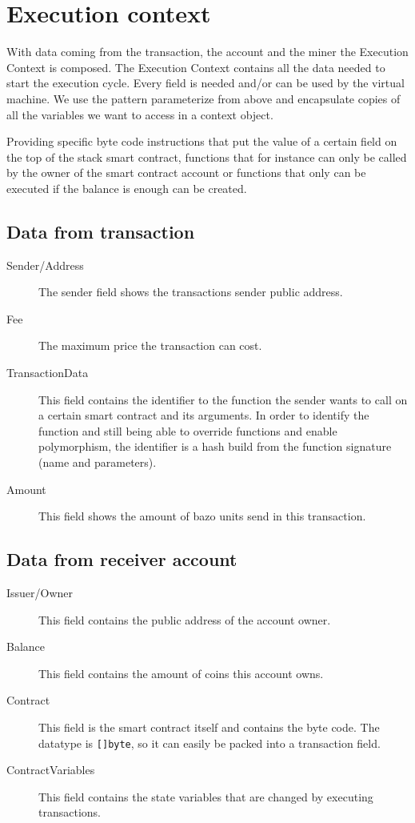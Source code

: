 \section{Execution context}
With data coming from the transaction, the account and the miner the Execution Context is composed. The Execution Context contains all the data needed to start the execution cycle. Every field is needed and/or can be used by the virtual machine. We use the pattern parameterize from above and encapsulate copies of all the variables we want to access in a context object.

Providing specific byte code instructions that put the value of a certain field on the top of the stack smart contract, functions that for instance can only be called by the owner of the smart contract account or functions that only can be executed if the balance is enough can be created.

\subsection{Data from transaction}
\begin{description}
  \item[Sender/Address] The sender field shows the transactions sender public address.
  \item[Fee] The maximum price the transaction can cost.
  \item[TransactionData] This field contains the identifier to the function the sender wants to call on a certain smart contract and its arguments. In order to identify the function and still being able to override functions and enable polymorphism, the identifier is a hash build from the function signature (name and parameters).
  \item[Amount] This field shows the amount of bazo units send in this transaction.
\end{description}

\subsection{Data from receiver account}
\begin{description}
  \item[Issuer/Owner] This field contains the public address of the account owner.
  \item[Balance] This field contains the amount of coins this account owns.
  \item[Contract] This field is the smart contract itself and contains the byte code. The datatype is \texttt{[]byte}, so it can easily be packed into a transaction field.
  \item[ContractVariables] This field contains the state variables that are changed by executing transactions.
\end{description}

